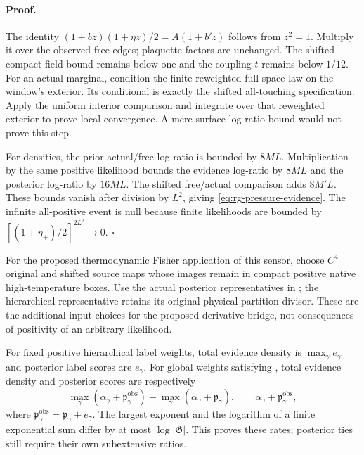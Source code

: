 \paragraph{Proof.}
The identity $(1+bz)(1+\eta z)/2=A(1+b'z)$ follows from $z^2=1$.
Multiply it over the observed free edges; plaquette factors are unchanged.
The shifted compact field bound remains below one and the coupling $t$
remains below $1/12$. For an actual marginal, condition the finite
reweighted full-space law on the window's exterior. Its conditional is
exactly the shifted all-touching specification. Apply the uniform interior
comparison and integrate over that reweighted exterior to prove local
convergence. A mere surface log-ratio bound would not prove this step.

For densities, the prior actual/free log-ratio is bounded by $8ML$.
Multiplication by the same positive likelihood bounds the evidence
log-ratio by $8ML$ and the posterior log-ratio by $16ML$.
The shifted free/actual comparison adds $8M'L$. These bounds vanish after
division by $L^2$, giving \cref{eq:rg-pressure-evidence}. The infinite
all-positive event is null because finite likelihoods are bounded by
$[(1+\eta_+)/2]^{2L^2}\to0$.
$\square$

For the proposed thermodynamic Fisher application of this sensor,
choose $C^4$ original and shifted source maps whose images remain in
compact positive native high-temperature boxes. Use the actual
posterior representatives in
;
the hierarchical representative retains its original physical
partition divisor. These are the additional input choices for the
proposed derivative bridge, not consequences of positivity of an
arbitrary likelihood. 

For fixed positive hierarchical label weights, total evidence density is
$\max_\gamma e_\gamma$ and posterior label scores are $e_\gamma$.
For global weights satisfying , total
evidence density and posterior scores are respectively
\begin{equation}
 \max_\gamma(\alpha_\gamma+\mathfrak p_\gamma^{\mathrm{obs}})
   -\max_\gamma(\alpha_\gamma+\mathfrak p_\gamma),\qquad
 \alpha_\gamma+\mathfrak p_\gamma^{\mathrm{obs}},
 \label{eq:rg-pressure-evidence-global}
\end{equation}
where $\mathfrak p_\gamma^{\mathrm{obs}}=\mathfrak p_\gamma+e_\gamma$.
The largest exponent and the logarithm of a finite exponential sum differ
by at most $\log|\mathfrak G|$. This proves these rates; posterior ties
still require their own subextensive ratios. 

